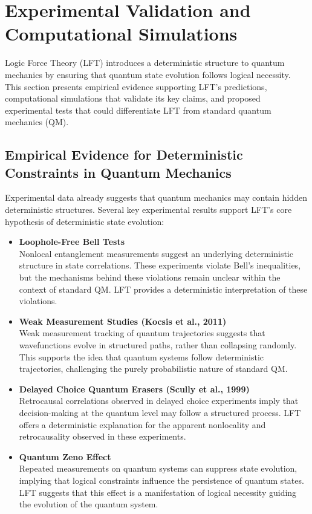 \section{Experimental Validation and Computational Simulations}

Logic Force Theory (LFT) introduces a deterministic structure to quantum mechanics by ensuring that quantum state evolution follows logical necessity. This section presents empirical evidence supporting LFT’s predictions, computational simulations that validate its key claims, and proposed experimental tests that could differentiate LFT from standard quantum mechanics (QM).

\subsection{Empirical Evidence for Deterministic Constraints in Quantum Mechanics}
Experimental data already suggests that quantum mechanics may contain hidden deterministic structures. Several key experimental results support LFT’s core hypothesis of deterministic state evolution:

\begin{itemize}
    \item \textbf{Loophole-Free Bell Tests} \\
    Nonlocal entanglement measurements suggest an underlying deterministic structure in state correlations. These experiments violate Bell's inequalities, but the mechanisms behind these violations remain unclear within the context of standard QM. LFT provides a deterministic interpretation of these violations.
    
    \item \textbf{Weak Measurement Studies (Kocsis et al., 2011)} \\
    Weak measurement tracking of quantum trajectories suggests that wavefunctions evolve in structured paths, rather than collapsing randomly. This supports the idea that quantum systems follow deterministic trajectories, challenging the purely probabilistic nature of standard QM.
    
    \item \textbf{Delayed Choice Quantum Erasers (Scully et al., 1999)} \\
    Retrocausal correlations observed in delayed choice experiments imply that decision-making at the quantum level may follow a structured process. LFT offers a deterministic explanation for the apparent nonlocality and retrocausality observed in these experiments.

    \item \textbf{Quantum Zeno Effect} \\
    Repeated measurements on quantum systems can suppress state evolution, implying that logical constraints influence the persistence of quantum states. LFT suggests that this effect is a manifestation of logical necessity guiding the evolution of the quantum system.
\end{itemize}

